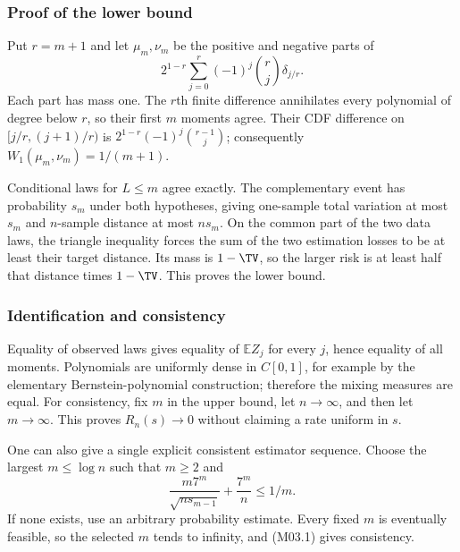 \documentclass[11pt,a4paper]{article}
\theoremstyle{definition}\newtheorem{definition}[theorem]{Definition}
\theoremstyle{remark}\newtheorem{remark}[theorem]{Remark}
\newcommand{\E}{\mathbb E}\newcommand{\one}{\mathbf 1}\newcommand{\1}{\mathbf 1}
\numberwithin{equation}{section}
\begin{document}
\subsubsection{Proof of the lower bound}
Put $r=m+1$ and let $\mu_m,\nu_m$ be the positive and negative parts of
\[
 2^{1-r}\sum_{j=0}^r(-1)^j\binom{r}{j}\delta_{j/r}.
\]
Each part has mass one. The $r$th finite difference annihilates every polynomial of degree below $r$, so their first $m$ moments agree. Their CDF difference on $[j/r,(j+1)/r)$ is $2^{1-r}(-1)^j\binom{r-1}{j}$; consequently $W_1(\mu_m,\nu_m)=1/(m+1)$.

Conditional laws for $L\le m$ agree exactly. The complementary event has probability $s_m$ under both hypotheses, giving one-sample total variation at most $s_m$ and $n$-sample distance at most $ns_m$. On the common part of the two data laws, the triangle inequality forces the sum of the two estimation losses to be at least their target distance. Its mass is $1-\TV$, so the larger risk is at least half that distance times $1-\TV$. This proves the lower bound.

\subsubsection{Identification and consistency}
Equality of observed laws gives equality of $\E Z_j$ for every $j$, hence equality of all moments. Polynomials are uniformly dense in $C[0,1]$, for example by the elementary Bernstein-polynomial construction; therefore the mixing measures are equal. For consistency, fix $m$ in the upper bound, let $n\to\infty$, and then let $m\to\infty$. This proves $R_n(s)\to0$ without claiming a rate uniform in $s$.

One can also give a single explicit consistent estimator sequence. Choose the largest $m\le\log n$ such that $m\ge2$ and
\[
 \frac{m7^m}{\sqrt{ns_{m-1}}}+\frac{7^m}{n}\le1/m.
\]
If none exists, use an arbitrary probability estimate. Every fixed $m$ is eventually feasible, so the selected $m$ tends to infinity, and (M03.1) gives consistency.
\end{document}
